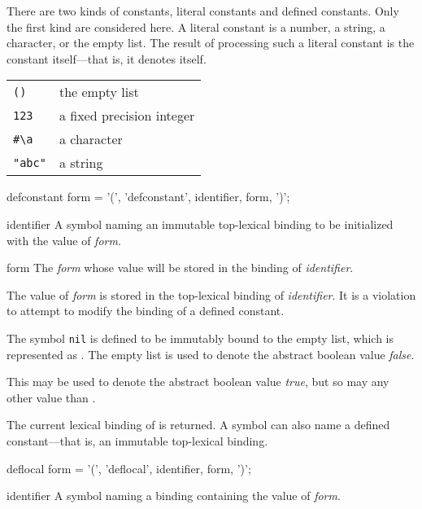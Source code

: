 \begin{optDefinition}
\noindent
%
\noindent
There are two kinds of constants, literal
constants and defined constants.  Only the
first kind are considered here.  A literal constant is a number, a string, a
character, or the empty list.  The result of processing such a literal constant
is the constant itself---that is, it denotes
itself.
%
\examples
\begin{tabular}{ll}
    \verb+()+ & the empty list\\
    \verb+123+ & a fixed precision integer\\
    \verb+#\a+ & a character\\
    \verb+"abc"+ & a string
\end{tabular}

%
\Syntax
\savesyntax{}\vbox{\small\syntax
defconstant form
   = '(', 'defconstant', identifier, form, ')';
\endsyntax}
%
\begin{arguments}
    \item[identifier] A symbol naming an immutable top-lexical binding to be
    initialized with the value of {\em form}.

    \item[form] The {\em form} whose value will be stored in the binding of {\em
        identifier}.
\end{arguments}
%
\remarks%
The value of {\em form} is stored in the top-lexical binding of {\em
    identifier}.  It is a violation to attempt to modify the binding of a
defined constant.

%
\remarks%
The symbol {\tt nil} is defined to be immutably bound to the empty list, which
is represented as \nil.  The empty list is used to denote the abstract boolean
value {\em false}.

%
\remarks%
This may be used to denote the abstract boolean value {\em true}, but so may any
other value than \nil.

\noindent
The current lexical binding of  is
returned.  A symbol can also name a defined
constant---that is, an immutable top-lexical binding.

%
\Syntax
\savesyntax{}\vbox{\small\syntax
deflocal form
   = '(', 'deflocal', identifier, form, ')';
\endsyntax}
%
\begin{arguments}
    \item[identifier] A symbol naming a binding containing the value of {\em
        form}.


\end{arguments}
\end{optDefinition}
